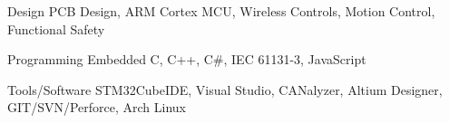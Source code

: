


\begin{cvskills}

    \cvskill
    {Design} %
    {PCB Design, ARM Cortex MCU, Wireless Controls, Motion Control, Functional Safety} %

    \cvskill
    {Programming} %
    {Embedded C, C++, C\#, IEC 61131-3, JavaScript} %



    \cvskill
    {Tools/Software} %
    {STM32CubeIDE, Visual Studio, CANalyzer, Altium Designer, GIT/SVN/Perforce, Arch Linux} %


\end{cvskills}